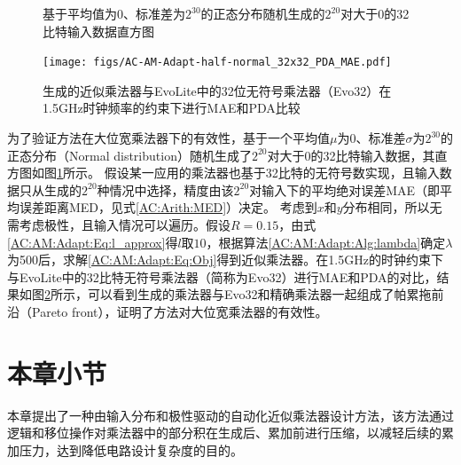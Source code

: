 \begin{figure}[!htb]
    \centering
\caption{基于平均值为0、标准差为$2^{30}$的正态分布随机生成的$2^{20}$对大于0的32比特输入数据直方图}
\label{AC:AM:Adapt:Fig:half-normal_histograms}
\end{figure}

\begin{figure}[!h]
    \centering
    \texttt{[image: figs/AC-AM-Adapt-half-normal\_32x32\_PDA\_MAE.pdf]}
    \caption{生成的近似乘法器与EvoLite中的32位无符号乘法器（Evo32）在1.5GHz时钟频率的约束下进行MAE和PDA比较}
    \label{AC:AM:Adapt:Fig:half-norm_32x32_PDA_MAE}
\end{figure}

为了验证方法在大位宽乘法器下的有效性，基于一个平均值$\mu$为0、标准差$\sigma$为$2^{30}$的正态分布（Normal distribution）随机生成了$2^{20}$对大于0的32比特输入数据，其直方图如图\ref{AC:AM:Adapt:Fig:half-normal_histograms}所示。
假设某一应用的乘法器也基于32比特的无符号数实现，且输入数据只从生成的$2^{20}$种情况中选择，精度由该$2^{20}$对输入下的平均绝对误差MAE（即平均误差距离MED，见式\ref{AC:Arith:MED}）决定。
考虑到$x$和$y$分布相同，所以无需考虑极性，且输入情况可以遍历。假设$R=0.15$，由式\eqref{AC:AM:Adapt:Eq:l_approx}得$l$取$10$，根据算法\ref{AC:AM:Adapt:Alg:lambda}确定$\lambda$为500后，求解\eqref{AC:AM:Adapt:Eq:Obj}得到近似乘法器。在1.5GHz的时钟约束下与EvoLite\cite{AC:AM:CGP_EvoLite}中的32比特无符号乘法器（简称为Evo32）进行MAE和PDA的对比，结果如图\ref{AC:AM:Adapt:Fig:half-norm_32x32_PDA_MAE}所示，可以看到生成的乘法器与Evo32和精确乘法器一起组成了帕累拖前沿（Pareto front），证明了方法对大位宽乘法器的有效性。

\section{本章小节}


本章提出了一种由输入分布和极性驱动的自动化近似乘法器设计方法，该方法通过逻辑和移位操作对乘法器中的部分积在生成后、累加前进行压缩，以减轻后续的累加压力，达到降低电路设计复杂度的目的。

